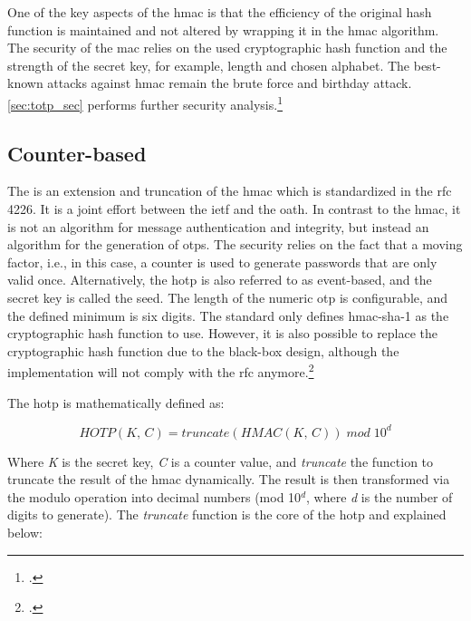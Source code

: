 One of the key aspects of the \gls{hmac} is that the efficiency of the original hash function is maintained and not altered by wrapping it in the \gls{hmac} algorithm. The security of the \gls{mac} relies on the used cryptographic hash function and the strength of the secret key, for example, length and chosen alphabet. The best-known attacks against \gls{hmac} remain the brute force and birthday attack. \autoref{sec:totp_sec} performs further security analysis.\footcites[See][Chapter 10.4.1]{2308830}[See][398]{1679747}[See][3, 10--13]{10.1007/3-540-68697-5_1}[See][]{10.1007/3-540-44750-4_1}

\subsection{Counter-based}
\label{subsec:hotp}

The  is an extension and truncation of the \gls{hmac} which is standardized in the \gls{rfc} 4226. It is a joint effort between the \gls{ietf} and the \gls{oath}. In contrast to the \gls{hmac}, it is not an algorithm for message authentication and integrity, but instead an algorithm for the generation of \glspl{otp}. The security relies on the fact that a \frqq moving factor\flqq, i.e., in this case, a counter is used to generate passwords that are only valid once. Alternatively, the \gls{hotp} is also referred to as event-based, and the secret key is called the seed. The length of the numeric \gls{otp} is configurable, and the defined minimum is six digits. The standard only defines \gls{hmac}-\gls{sha}-1 as the cryptographic hash function to use. However, it is also possible to replace the cryptographic hash function due to the black-box design, although the implementation will not comply with the \gls{rfc} anymore.\footcites[See][]{m2005rfc}[See][Chapter 3]{9781849287333}

The \gls{hotp} is mathematically defined as:

\begin{equation*}
	HOTP(K,\, C) = truncate(HMAC(K,\, C))\; mod \; 10^d
\end{equation*}

Where \textit{K} is the secret key, \textit{C} is a counter value, and \textit{truncate} the function to truncate the result of the \gls{hmac} dynamically. The result is then transformed via the modulo operation into decimal numbers 	(mod 10$^d$, where \textit{d} is the number of digits to generate). The \textit{truncate} function is the core of the \gls{hotp} and explained below:

